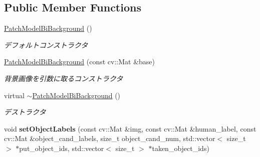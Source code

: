 \subsection*{Public Member Functions}
\begin{DoxyCompactItemize}
\item 
\hypertarget{classskl_1_1_patch_model_bi_background_ad3813e93a67f1f3921f4dc116ac0f8d4}{}\label{classskl_1_1_patch_model_bi_background_ad3813e93a67f1f3921f4dc116ac0f8d4} 
\hyperlink{classskl_1_1_patch_model_bi_background_ad3813e93a67f1f3921f4dc116ac0f8d4}{Patch\+Model\+Bi\+Background} ()
\begin{DoxyCompactList}\small\item\em デフォルトコンストラクタ \end{DoxyCompactList}\item 
\hypertarget{classskl_1_1_patch_model_bi_background_aeb304f991c2e68c0628b046fa9d8e091}{}\label{classskl_1_1_patch_model_bi_background_aeb304f991c2e68c0628b046fa9d8e091} 
\hyperlink{classskl_1_1_patch_model_bi_background_aeb304f991c2e68c0628b046fa9d8e091}{Patch\+Model\+Bi\+Background} (const cv\+::\+Mat \&base)
\begin{DoxyCompactList}\small\item\em 背景画像を引数に取るコンストラクタ \end{DoxyCompactList}\item 
\hypertarget{classskl_1_1_patch_model_bi_background_a223018a69ee36da60092cc9e2b9ea6ca}{}\label{classskl_1_1_patch_model_bi_background_a223018a69ee36da60092cc9e2b9ea6ca} 
virtual \hyperlink{classskl_1_1_patch_model_bi_background_a223018a69ee36da60092cc9e2b9ea6ca}{$\sim$\+Patch\+Model\+Bi\+Background} ()
\begin{DoxyCompactList}\small\item\em デストラクタ \end{DoxyCompactList}\item 
\hypertarget{classskl_1_1_patch_model_bi_background_aa720b6806d9742ef75fef2f905ec9396}{}\label{classskl_1_1_patch_model_bi_background_aa720b6806d9742ef75fef2f905ec9396} 
void {\bfseries set\+Object\+Labels} (const cv\+::\+Mat \&img, const cv\+::\+Mat \&human\+\_\+label, const cv\+::\+Mat \&object\+\_\+cand\+\_\+labels, size\+\_\+t object\+\_\+cand\+\_\+num, std\+::vector$<$ size\+\_\+t $>$ $\ast$put\+\_\+object\+\_\+ids, std\+::vector$<$ size\+\_\+t $>$ $\ast$taken\+\_\+object\+\_\+ids)
\item 
\hypertarget{classskl_1_1_patch_model_bi_background_a65303d6831841eb507c2b9556e553a43}{}\label{classskl_1_1_patch_model_bi_background_a65303d6831841eb507c2b9556e553a43} 

\end{DoxyCompactItemize}
